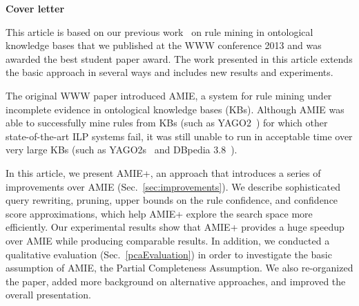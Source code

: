 \begin{figure*}[t!]
\hspace{.1\textwidth}
\begin{minipage}{.8\textwidth}
  \begin{centering}
    \LARGE\textbf{Cover letter}
    \vspace{.3em}
  \end{centering}

  \large
This article is based on our previous work~\cite{amie} on rule mining in ontological knowledge bases that we published at the WWW conference 2013 and was awarded 
the best student paper award. The work presented in this article extends the basic approach in several ways and includes new results and experiments.

The original WWW paper introduced AMIE, a system for rule mining under incomplete evidence in ontological knowledge bases (KBs).
Although AMIE was able to successfully mine rules from KBs (such as YAGO2~\cite{yago2}) for which other state-of-the-art ILP systems fail, it was still unable to run in acceptable time over very large KBs (such as YAGO2s~\cite{yago2s} and DBpedia 3.8~\cite{dbpedia}).

In this article, we present AMIE+, an approach that introduces a series of improvements over AMIE (Sec.~\ref{sec:improvements}).
We describe sophisticated query rewriting, pruning, upper bounds on the rule confidence, and confidence score approximations, which help AMIE+ explore the search space more efficiently.
Our experimental results show that AMIE+ provides a huge speedup over AMIE while producing comparable results.
In addition, we conducted a qualitative evaluation (Sec.~\ref{pcaEvaluation}) in order to investigate the basic assumption of AMIE, the Partial Completeness Assumption. %
We also re-organized the paper, added more background on alternative approaches,  and improved the overall presentation.

\end{minipage}
\end{figure*}

